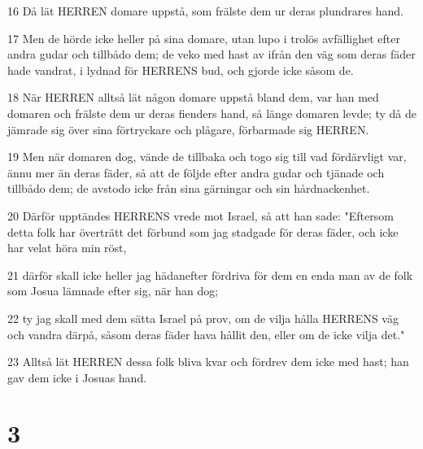 \par 16 Då lät HERREN domare uppstå, som frälste dem ur deras plundrares hand.
\par 17 Men de hörde icke heller på sina domare, utan lupo i trolös avfällighet efter andra gudar och tillbådo dem; de veko med hast av ifrån den väg som deras fäder hade vandrat, i lydnad för HERRENS bud, och gjorde icke såsom de.
\par 18 När HERREN alltså lät någon domare uppstå bland dem, var han med domaren och frälste dem ur deras fienders hand, så länge domaren levde; ty då de jämrade sig över sina förtryckare och plågare, förbarmade sig HERREN.
\par 19 Men när domaren dog, vände de tillbaka och togo sig till vad fördärvligt var, ännu mer än deras fäder, så att de följde efter andra gudar och tjänade och tillbådo dem; de avstodo icke från sina gärningar och sin hårdnackenhet.
\par 20 Därför upptändes HERRENS vrede mot Israel, så att han sade: "Eftersom detta folk har överträtt det förbund som jag stadgade för deras fäder, och icke har velat höra min röst,
\par 21 därför skall icke heller jag hädanefter fördriva för dem en enda man av de folk som Josua lämnade efter sig, när han dog;
\par 22 ty jag skall med dem sätta Israel på prov, om de vilja hålla HERRENS väg och vandra därpå, såsom deras fäder hava hållit den, eller om de icke vilja det."
\par 23 Alltså lät HERREN dessa folk bliva kvar och fördrev dem icke med hast; han gav dem icke i Josuas hand.

\chapter{3}

